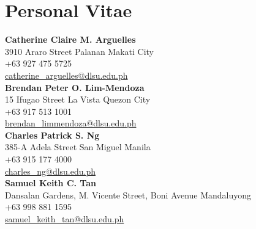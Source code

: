 \chapter{Personal Vitae}
\newcommand{\proponent}[4]{\textbf{#1} \\ #2 \\ #3 \\ \url{#4}\vspace{2em} \\}

\proponent{Catherine Claire M. Arguelles}{3910 Araro Street Palanan Makati City}{+63 927 475 5725}{catherine_arguelles@dlsu.edu.ph}
\proponent{Brendan Peter O. Lim-Mendoza}{15 Ifugao Street La Vista Quezon City}{+63 917 513 1001}{brendan_limmendoza@dlsu.edu.ph}
\proponent{Charles Patrick S. Ng}{385-A Adela Street San Miguel Manila}{+63 915 177 4000}{charles_ng@dlsu.edu.ph}
\proponent{Samuel Keith C. Tan}{Dansalan Gardens, M. Vicente Street, Boni Avenue Mandaluyong}{+63 998 881 1595}{samuel_keith_tan@dlsu.edu.ph}